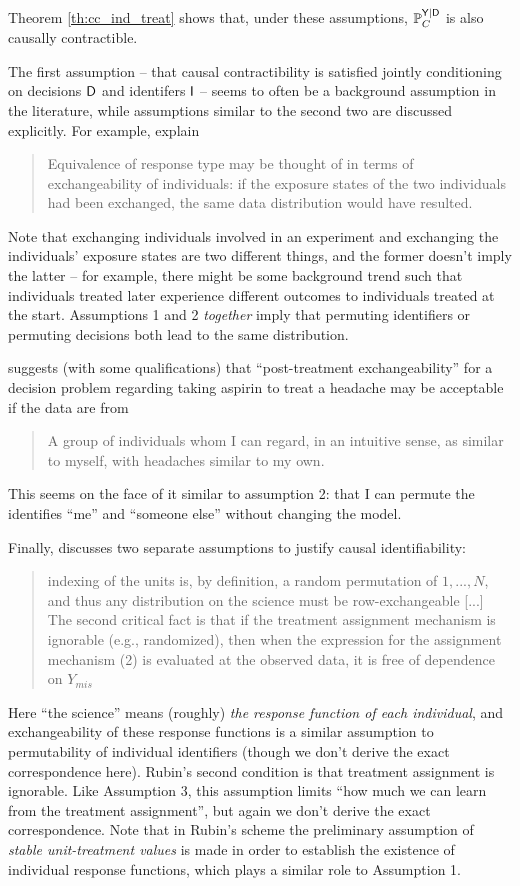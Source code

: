 Theorem \ref{th:cc_ind_treat} shows that, under these assumptions, $\mathbb{P}_C^{\mathsf{Y}|\mathsf{D}}$ is also causally contractible.

The first assumption -- that causal contractibility is satisfied jointly conditioning on decisions $\mathsf{D}$ and identifers $\mathsf{I}$ -- seems to often be a background assumption in the literature, while assumptions similar to the second two are discussed explicitly. For example, \citet{greenland_identifiability_1986} explain
\begin{quote}
    Equivalence of response type may be thought of in terms of exchangeability of individuals: if the exposure states of the two individuals had been exchanged, the same data distribution would have resulted.
\end{quote}
Note that exchanging individuals involved in an experiment and exchanging the individuals' exposure states are two different things, and the former doesn't imply the latter -- for example, there might be some background trend such that individuals treated later experience different outcomes to individuals treated at the start. Assumptions 1 and 2 \emph{together} imply that permuting identifiers or permuting decisions both lead to the same distribution.

\citet{dawid_decision-theoretic_2020} suggests (with some qualifications) that ``post-treatment exchangeability'' for a decision problem regarding taking aspirin to treat a headache may be acceptable if the data are from
\begin{quote}
    A group of individuals whom I can regard, in an intuitive sense, as similar to myself, with headaches similar to my own.
\end{quote}
This seems on the face of it similar to assumption 2: that I can permute the identifies ``me'' and ``someone else'' without changing the model.

Finally, \citet{rubin_causal_2005} discusses two separate assumptions to justify causal identifiability:
\begin{quote}
    indexing of the units is, by definition, a random permutation of $1,..., N$, and thus any distribution on the science must be row-exchangeable [...] The second critical fact is that if the treatment assignment mechanism is ignorable (e.g., randomized), then when the expression for the assignment mechanism (2) is evaluated at the observed data, it is free of dependence on $Y_{mis}$
\end{quote}
Here ``the science'' means (roughly) \emph{the response function of each individual}, and exchangeability of these response functions is a similar assumption to permutability of individual identifiers (though we don't derive the exact correspondence here). Rubin's second condition is that treatment assignment is ignorable. Like Assumption 3, this assumption limits ``how much we can learn from the treatment assignment'', but again we don't derive the exact correspondence. Note that in Rubin's scheme the preliminary assumption of \emph{stable unit-treatment values} is made in order to establish the existence of individual response functions, which plays a similar role to Assumption 1. 


